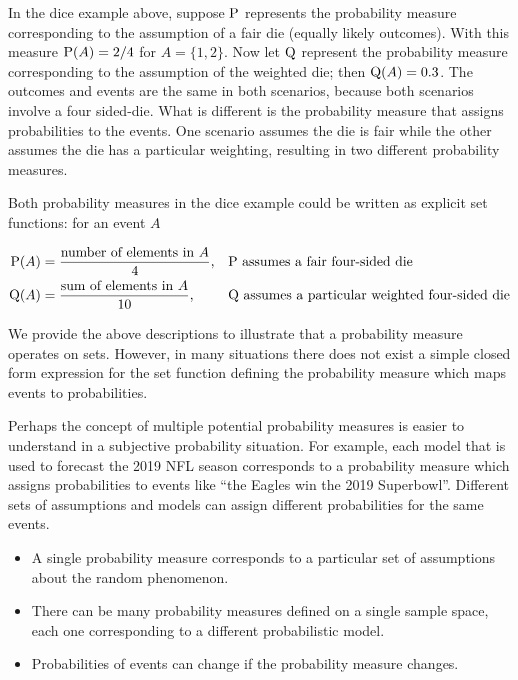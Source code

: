 \documentclass[
]{book}
\providecommand{\tightlist}{%
  \setlength{\itemsep}{0pt}\setlength{\parskip}{0pt}}
\theoremstyle{definition}
\theoremstyle{definition}
\theoremstyle{definition}
\theoremstyle{remark}
\begin{document}
In the dice example above, suppose \(\textrm{P}\) represents the probability measure corresponding to the assumption of a fair die (equally likely outcomes). With this measure \(\textrm{P}(A) = 2/4\) for \(A = \{1, 2\}\). Now let \(\textrm{Q}\) represent the probability measure corresponding to the assumption of the weighted die; then \(\textrm{Q}(A) = 0.3\). The outcomes and events are the same in both scenarios, because both scenarios involve a four sided-die. What is different is the probability measure that assigns probabilities to the events. One scenario assumes the die is fair while the other assumes the die has a particular weighting, resulting in two different probability measures.

Both probability measures in the dice example could be written as explicit set functions: for an event \(A\)

\begin{align*}
\textrm{P}(A) & = \frac{\text{number of elements in $A$}}{4}, & & {\text{$\textrm{P}$ assumes a fair four-sided die}}
\\
\textrm{Q}(A) & = \frac{\text{sum of elements in $A$}}{10}, & & {\text{$\textrm{Q}$ assumes a particular weighted four-sided die}}
\end{align*}

We provide the above descriptions to illustrate that a probability measure operates on sets. However, in many situations there does not exist a simple closed form expression for the set function defining the probability measure which maps events to probabilities.

Perhaps the concept of multiple potential probability measures is easier to understand in a subjective probability situation. For example, each model that is used to forecast the 2019 NFL season corresponds to a probability measure which assigns probabilities to events like ``the Eagles win the 2019 Superbowl''. Different sets of assumptions and models can assign different probabilities for the same events.

\begin{itemize}
\tightlist
\item
  A single probability measure corresponds to a particular set of assumptions about the random phenomenon.
\item
  There can be many probability measures defined on a single sample space, each one corresponding to a different probabilistic model.
\item
  Probabilities of events can change if the probability measure changes.
\end{itemize}
\end{document}
